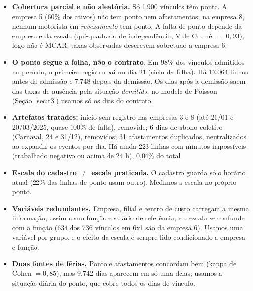 \documentclass[11pt,a4paper]{article}
\begin{document}
\begin{itemize}
\item \textbf{Cobertura parcial e não aleatória.} Só 1.900 vínculos têm ponto. A empresa 5 (60\% dos ativos) não tem ponto nem afastamentos; na empresa 8, nenhum motorista em \emph{revezamento} tem ponto. A falta de ponto depende da empresa e da escala (qui-quadrado de independência, V de Cramér $=0{,}93$), logo não é MCAR: taxas observadas descrevem sobretudo a empresa 6.
\item \textbf{O ponto segue a folha, não o contrato.} Em 98\% dos vínculos admitidos no período, o primeiro registro cai no dia 21 (ciclo da folha). Há 13.064 linhas antes da admissão e 7.748 depois da demissão. Os dias após a demissão saem das taxas de ausência pela situação \emph{demitido}; no modelo de Poisson (Seção~\ref{sec:t3}) usamos só os dias do contrato.
\item \textbf{Artefatos tratados:} início sem registro nas empresas 3 e 8 (até 20/01 e 20/03/2025, quase 100\% de falta), removido; 6 dias de abono coletivo (Carnaval, 24 e 31/12), removidos; 31 afastamentos duplicados, neutralizados ao expandir os eventos por dia. Há ainda 223 linhas com minutos impossíveis (trabalhado negativo ou acima de 24 h), 0,04\% do total.
\item \textbf{Escala do cadastro $\neq$ escala praticada.} O cadastro guarda só o horário atual (22\% das linhas de ponto usam outro). Medimos a escala no próprio ponto.
\item \textbf{Variáveis redundantes.} Empresa, filial e centro de custo carregam a mesma informação, assim como função e salário de referência, e a escala se confunde com a função (634 dos 736 vínculos em 6x1 são da empresa 6). Usamos uma variável por grupo, e o efeito da escala é sempre lido condicionado a empresa e função.
\item \textbf{Duas fontes de férias.} Ponto e afastamentos concordam bem (kappa de Cohen $=0{,}85$), mas 9.742 dias aparecem em só uma delas; usamos a situação diária do ponto, que cobre todos os dias de vínculo.
\end{itemize}
\end{document}
